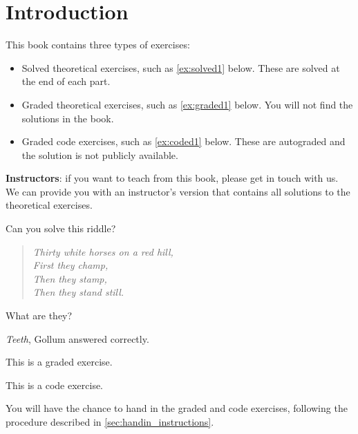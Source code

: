 
\section{Introduction}

This book contains three types of exercises:

\begin{itemize}

    \item Solved theoretical exercises, such as \cref{ex:solved1} below.
          These are solved at the end of each part.
    \item Graded theoretical exercises, such as \cref{ex:graded1} below.
          You will not find the solutions in the book.
    \item Graded code exercises, such as \cref{ex:coded1} below.
          These are autograded and the solution is not publicly available.
\end{itemize}

\begin{remark}
    \textbf{Instructors}: if you want to teach from this book, please get in touch with us.
    We can provide you with an instructor's version that contains all solutions to the theoretical exercises.
\end{remark}

\begin{exercise}
    \label{ex:solved1}
    Can you solve this riddle?
    \begin{quote}
        \itshape%
        Thirty white horses on a red hill,\\
        First they champ,\\
        Then they stamp,\\
        Then they stand still.
    \end{quote}
    What are they?
\end{exercise}
\begin{solution}
    \emph{Teeth}, Gollum answered correctly.
\end{solution}

\begin{gradedexercise}
    \label{ex:graded1}
    This is a graded exercise.
\end{gradedexercise}

\begin{codeexercise}
    \label{ex:coded1}
    This is a code exercise.
\end{codeexercise}

You will have the chance to hand in the graded and code exercises, following the procedure described in \cref{sec:handin_instructions}.

